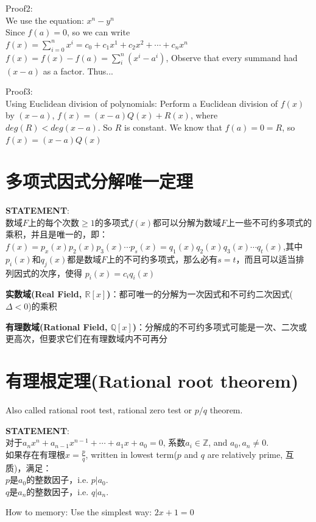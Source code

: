 \documentclass[../main.tex]{subfiles}
\begin{document}
Proof2:\\
We use the equation: $x^n-y^n$\\
Since $f(a)=0$, so we can write $f(x)=\sum_{i=0}^nx^i=c_0+c_1x^1+c_2x^2+\cdots +c_nx^n$\\
$f(x)=f(x)-f(a)=\sum_i^n(x^i-a^i)$, Observe that every summand had $(x-a)$ as a factor. Thus...

Proof3:\\
Using Euclidean division of polynomials: Perform a Euclidean division of $f(x)$ by $(x-a)$, $f(x)=(x-a)Q(x)+R(x)$, where $deg(R) < deg(x-a)$. So $R$ is constant. We know that $f(a)=0=R$, so $f(x)=(x-a)Q(x)$

\section{多项式因式分解唯一定理}
\begin{mdframed}
  \textbf{STATEMENT}:\\
  数域$F$上的每个次数$\ge 1$的多项式$f(x)$都可以分解为数域$F$上一些不可约多项式的乘积，并且是唯一的，即：\\
  $f(x)=p_{x}(x)p_2(x)p_3(x)\cdots p_{s}(x) = q_1(x)q_2(x)q_3(x)\cdots q_{t}(x)$,其中$p_{i}(x)$和$q_{j}(x)$都是数域$F$上的不可约多项式，那么必有$s=t$，而且可以适当排列因式的次序，使得
  $p_{i}(x)=c_{i}q_{i}(x)$
\end{mdframed}

\textbf{实数域(Real Field, $\mathbb{R}[x]$)}：都可唯一的分解为一次因式和不可约二次因式($\Delta <0$)的乘积

\textbf{有理数域(Rational Field, $\mathbb{Q}[x]$)}：分解成的不可约多项式可能是一次、二次或更高次，但要求它们在有理数域内不可再分

\section{有理根定理(Rational root theorem)}
Also called rational root test, rational zero test or $p/q$ theorem.

\begin{mdframed}
  \textbf{STATEMENT}:\\
  对于$a_{n}x^{n} + a_{n-1}x^{n-1}+\cdots + a_1x+a_{0}=0$, \colorbox{BurntOrange}{系数$a_{i}\in \mathbb{Z}$, and $a_{0}, a_{n} \neq 0$.}\\
  如果存在有理根$x=\frac{p}{q}$, written in lowest term($p$ and $q$ are relatively prime, 互质)，满足：\\
  $p$是$a_{0}$的整数因子，i.e. $p|a_{0}$.\\
  $q$是$a_{n}$的整数因子，i.e. $q|a_{n}$.
\end{mdframed}
How to memory: Use the simplest way: $2x+1=0$
\end{document}
